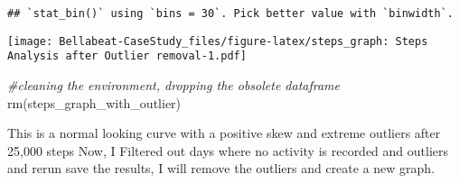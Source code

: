 \documentclass[
]{article}
\newenvironment{Shaded}{\begin{snugshade}}{\end{snugshade}}
\newcommand{\AttributeTok}[1]{\textcolor[rgb]{0.77,0.63,0.00}{#1}}
\newcommand{\CommentTok}[1]{\textcolor[rgb]{0.56,0.35,0.01}{\textit{#1}}}
\newcommand{\DecValTok}[1]{\textcolor[rgb]{0.00,0.00,0.81}{#1}}
\newcommand{\FloatTok}[1]{\textcolor[rgb]{0.00,0.00,0.81}{#1}}
\newcommand{\FunctionTok}[1]{\textcolor[rgb]{0.00,0.00,0.00}{#1}}
\newcommand{\NormalTok}[1]{#1}
\newcommand{\OtherTok}[1]{\textcolor[rgb]{0.56,0.35,0.01}{#1}}
\newcommand{\SpecialCharTok}[1]{\textcolor[rgb]{0.00,0.00,0.00}{#1}}
\newcommand{\StringTok}[1]{\textcolor[rgb]{0.31,0.60,0.02}{#1}}
\begin{document}
\begin{verbatim}
## `stat_bin()` using `bins = 30`. Pick better value with `binwidth`.
\end{verbatim}

\texttt{[image: Bellabeat-CaseStudy\_files/figure-latex/steps\_graph: Steps Analysis after Outlier removal-1.pdf]}

\begin{Shaded}
\begin{Highlighting}[]
\CommentTok{\#cleaning the environment, dropping the obsolete dataframe}
\FunctionTok{rm}\NormalTok{(steps\_graph\_with\_outlier)}
\end{Highlighting}
\end{Shaded}

This is a normal looking curve with a positive skew and extreme outliers
after 25,000 steps Now, I Filtered out days where no activity is
recorded and outliers and rerun save the results, I will remove the
outliers and create a new graph.

\begin{Shaded}
\end{Shaded}
\end{document}
